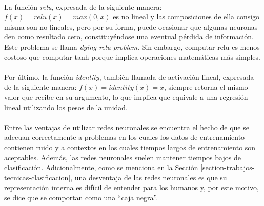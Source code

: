 \newpage %

\paragraph{} La función \textit{relu}, expresada de la siguiente manera: $f(x) = relu(x) = max(0, x)$ es no lineal y las composiciones de ella consigo misma son no lineales, pero por su forma, puede ocasionar que algunas neuronas den como resultado cero, constituyéndose una eventual pérdida de información.
Este problema se llama \textit{dying relu problem}.
Sin embargo, computar relu es menos costoso que computar tanh porque implica operaciones matemáticas más simples.

\paragraph{} Por último, la función \textit{identity}, también llamada de activación lineal, expresada de la siguiente manera: $f(x) = identity(x) = x$, siempre retorna el mismo valor que recibe en su argumento, lo que implica que equivale a una regresión lineal utilizando los pesos de la unidad.

\paragraph{}Entre las ventajas de utilizar redes neuronales se encuentra el hecho de que se adecuan correctamente a problemas en los cuales los datos de entrenamiento contienen ruido y a contextos en los cuales tiempos largos de entrenamiento son aceptables.
Además, las redes neuronales suelen mantener tiempos bajos de clasificación.
Adicionalmente, como se menciona en la Sección \ref{section-trabajos-tecnicas-clasificacion}, una desventaja de las redes neuronales es que su representación interna es difícil de entender para los humanos y, por este motivo, se dice que se comportan como una “caja negra”.